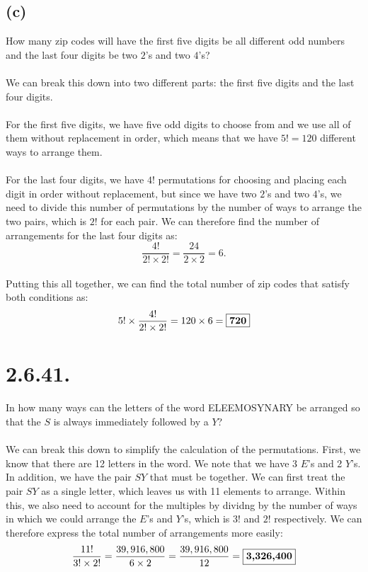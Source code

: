 \documentclass{article}
\begin{document}
{\subsection*{(c)} 
How many zip codes will have the first five digits be all different odd numbers and the last four digits be two \(2\)'s and two \(4\)'s?
\\
\\
We can break this down into two different parts: the first five digits and the last four digits.
\\
\\
For the first five digits, we have five odd digits to choose from and we use all of them without replacement in order, which means that we have \(5! = 120\) different ways to arrange them. 
\\
\\
For the last four digits, we have \(4!\) permutations for choosing and placing each digit in order without replacement, but since we have two \(2\)'s and two \(4\)'s, we need to divide this number of permutations by the number of ways to arrange the two pairs, which is \(2!\) for each pair. We can therefore find the number of arrangements for the last four digits as: 
\[
\frac{4!}{2! \times 2!} = \frac{24}{2 \times 2} = 6.
\]\@
\\
Putting this all together, we can find the total number of zip codes that satisfy both conditions as:
\[
5! \times \frac{4!}{2! \times 2!} = 120 \times 6 = \fbox{\textbf{720}}
\]

\section*{2.6.41.} 
In how many ways can the letters of the word
ELEEMOSYNARY
be arranged so that the \(S\) is always immediately followed by a \(Y\)?
\\
\\
We can break this down to simplify the calculation of the permutations. First, we know that there are 12 letters in the word. We note that we have 3 \(E\)'s and 2 \(Y\)'s. In addition, we have the pair \(SY\) that must be together. We can first treat the pair \(SY\) as a single letter, which leaves us with 11 elements to arrange. Within this, we also need to account for the multiples by dividng by the number of ways in which we could arrange the \(E\)'s and \(Y\)'s, which is \(3!\) and \(2!\) respectively. We can therefore express the total number of arrangements more easily:
\[
\frac{11!}{3! \times 2!} = \frac{39,916,800}{6 \times 2} = \frac{39,916,800}{12} = \fbox{\textbf{3,326,400}}
\]

}
\end{document}
